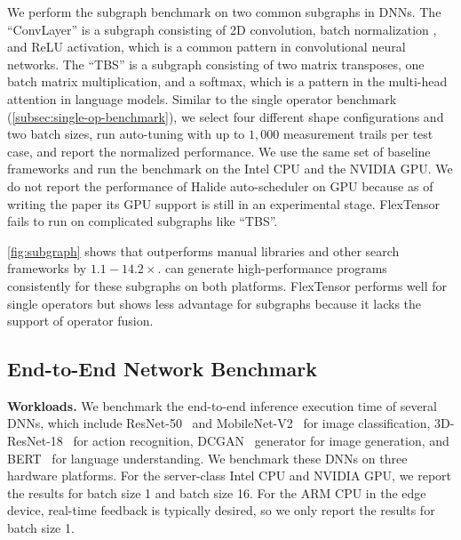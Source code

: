 We perform the subgraph benchmark on two common subgraphs in DNNs.
The ``ConvLayer'' is a subgraph consisting of 2D convolution, batch normalization \cite{ioffe2015batch}, and ReLU activation, which is a common pattern in convolutional neural networks.
The ``TBS'' is a subgraph consisting of two matrix transposes, one batch matrix multiplication, and a softmax, which is a pattern in the multi-head attention \cite{vaswani2017attention} in language models.
Similar to the single operator benchmark (\autoref{subsec:single-op-benchmark}), we select four different shape configurations and two batch sizes, run auto-tuning with up to $1,000$ measurement trails per test case, and report the normalized performance.
We use the same set of baseline frameworks and run the benchmark on the Intel CPU and the NVIDIA GPU.
We do not report the performance of Halide auto-scheduler on GPU because as of writing the paper its GPU support is still in an experimental stage. FlexTensor fails to run on complicated subgraphs like ``TBS''.

\autoref{fig:subgraph} shows that \Ansor outperforms manual libraries and other search frameworks by $1.1-14.2\times$.
\Ansor can generate high-performance programs consistently for these subgraphs on both platforms.
FlexTensor performs well for single operators but shows less advantage for subgraphs because it lacks the support of operator fusion.

\subsection{End-to-End Network Benchmark}
\label{subsec:network-benchmark}

\textbf{Workloads.}
We benchmark the end-to-end inference execution time of several DNNs, which include ResNet-50~\cite{he2016deep} and MobileNet-V2~\cite{sandler2018mobilenetv2} for image classification, 3D-ResNet-18~\cite{hara3dcnns} for action recognition, DCGAN~\cite{radford2015unsupervised} generator for image generation, and BERT~\cite{devlin2018bert} for language understanding.
We benchmark these DNNs on three hardware platforms. For the server-class Intel CPU and NVIDIA GPU, we report the results for batch size 1 and batch size 16. For the ARM CPU in the edge device, real-time feedback is typically desired, so we only report the results for batch size 1.

